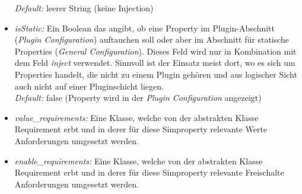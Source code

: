 \documentclass[a4paper, 11pt]{article} %
\begin{document}
\begin{itemize}
	\emph{Default:} leerer String (keine Injection)
	\item \emph{isStatic:} Ein Boolean das angibt, ob eine Property im Plugin-Abschnitt (\emph{Plugin Configuration}) auftauchen soll oder aber im Abschnitt für statische Properties (\emph{General Configuration}). Dieses Feld wird nur in Kombination mit dem Feld \emph{inject} verwendet. Sinnvoll ist der Einsatz meist dort, wo es sich um Properties handelt, die nicht zu einem Plugin gehören und aus logischer Sicht auch nicht auf einer Pluginschicht liegen.\\
	\emph{Default:} false (Property wird in der \emph{Plugin Configuration} angezeigt)
	\item \emph{value\_requirements:} Eine Klasse, welche von der abstrakten Klasse Requirement erbt und in derer für diese Simproperty relevante Werte Anforderungen umgesetzt werden.
	\item \emph{enable\_requirements:} Eine Klasse, welche von der abstrakten Klasse Requirement erbt und in derer für diese Simproperty relevante Freischalte Anforderungen umgesetzt werden.
\end{itemize}
\end{document}
